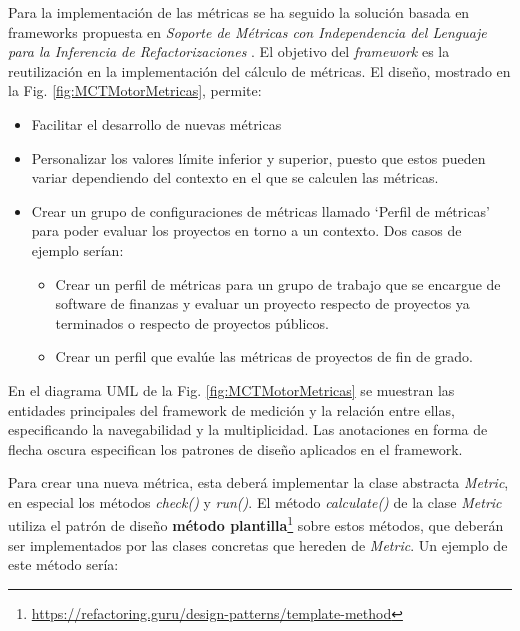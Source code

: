 Para la implementación de las métricas se ha seguido la solución basada en frameworks propuesta en \textit{Soporte de Métricas con Independencia del Lenguaje para la Inferencia de Refactorizaciones} \cite{marticorena_sanchez_soporte_2005}. El objetivo del \textit{framework} es la reutilización en la implementación del cálculo de métricas. El diseño, mostrado en la Fig. \ref{fig:MCTMotorMetricas}, permite:

\begin{itemize}
	\tightlist
	\item Facilitar el desarrollo de nuevas métricas
	\item Personalizar los valores límite inferior y superior, puesto que estos pueden variar dependiendo del contexto en el que se calculen las métricas.
	\item Crear un grupo de configuraciones de métricas llamado `Perfil de métricas' para poder evaluar los proyectos en torno a un contexto. Dos casos de ejemplo serían:
	\begin{itemize}
		\tightlist
		\item Crear un perfil de métricas para un grupo de trabajo que se encargue de software de finanzas y evaluar un proyecto respecto de proyectos ya terminados o respecto de proyectos públicos.
		\item Crear un perfil que evalúe las métricas de proyectos de fin de grado.
	\end{itemize}
\end{itemize}


En el diagrama UML de la Fig. \ref{fig:MCTMotorMetricas} se muestran las entidades principales del framework de medición y la relación entre ellas, especificando la navegabilidad y la multiplicidad. Las anotaciones en forma de flecha oscura especifican los patrones de diseño \cite{gamma_patrones_2002} aplicados en el framework.

Para crear una nueva métrica, esta deberá implementar la clase abstracta \textit{Metric}, en especial los métodos \textit{check()} y \textit{run()}. El método \textit{calculate()} de la clase \textit{Metric} utiliza el patrón de diseño \textbf{método plantilla}\footnote{\url{https://refactoring.guru/design-patterns/template-method}} sobre estos métodos, que deberán ser implementados por las clases concretas que hereden de \textit{Metric}. Un ejemplo de este método sería:

